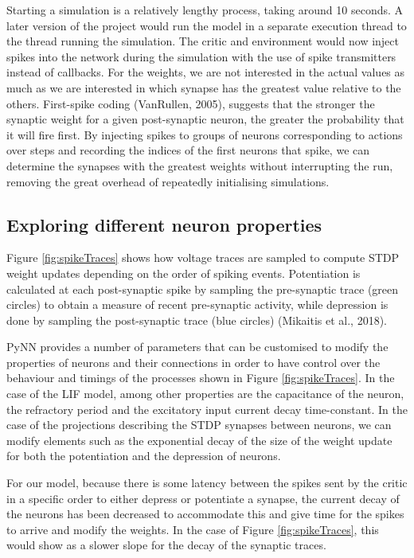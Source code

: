 \documentclass[10pt]{article}
\begin{document}
    Starting a simulation is a relatively lengthy process, taking around 10 seconds. A later version of the project would run the model in a separate execution thread to the thread running the simulation. The critic and environment would now inject spikes into the network during the simulation with the use of spike transmitters instead of callbacks. For the weights, we are not interested in the actual values as much as we are interested in which synapse has the greatest value relative to the others. First-spike coding (VanRullen, 2005), suggests that the stronger the synaptic weight for a given post-synaptic neuron, the greater the probability that it will fire first. By injecting spikes to groups of neurons corresponding to actions over steps and recording the indices of the first neurons that spike, we can determine the synapses with the greatest weights without interrupting the run, removing the great overhead of repeatedly initialising simulations.

    \subsection{Exploring different neuron properties}

    Figure \ref{fig:spikeTraces} shows how voltage traces are sampled to compute STDP weight updates depending on the order of spiking events. Potentiation is calculated at each post-synaptic spike by sampling the pre-synaptic trace (green circles) to obtain a measure of recent pre-synaptic activity, while depression is done by sampling the post-synaptic trace (blue circles) (Mikaitis et al., 2018).

    PyNN provides a number of parameters that can be customised to modify the properties of neurons and their connections in order to have control over the behaviour and timings of the processes shown in Figure \ref{fig:spikeTraces}. In the case of the LIF model, among other properties are the capacitance of the neuron, the refractory period and the excitatory input current decay time-constant. In the case of the projections describing the STDP synapses between neurons, we can modify elements such as the exponential decay of the size of the weight update for both the potentiation and the depression of neurons.

    For our model, because there is some latency between the spikes sent by the critic in a specific order to either depress or potentiate a synapse, the current decay of the neurons has been decreased to accommodate this and give time for the spikes to arrive and modify the weights. In the case of Figure \ref{fig:spikeTraces}, this would show as a slower slope for the decay of the synaptic traces.
    
\end{document}
